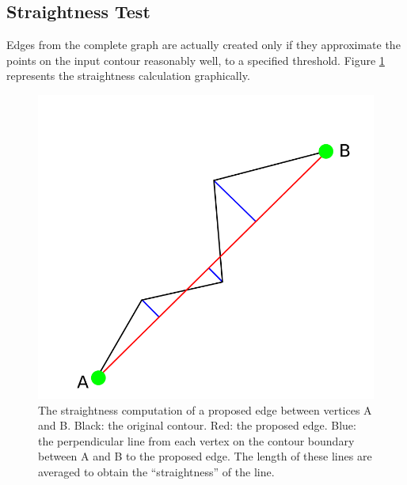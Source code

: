 \documentclass{InsightArticle}
\begin{document}
\subsection{Straightness Test}
\label{sec:Algorithm:StraightnessTest}
Edges from the complete graph are actually created only if they approximate the points on the input contour reasonably well, to a specified threshold. Figure \ref{fig:Straightness} represents the straightness calculation graphically.
\begin{figure}[H]
  \centering
  \includegraphics[width=0.3\linewidth]{images/straightness}
  \caption{The straightness computation of a proposed edge between vertices A and B. Black: the original contour. Red: the proposed edge. Blue: the perpendicular line from each vertex on the contour boundary between A and B to the proposed edge. The length of these lines are averaged to obtain the ``straightness'' of the line.}
  \label{fig:Straightness}
\end{figure}
\end{document}

